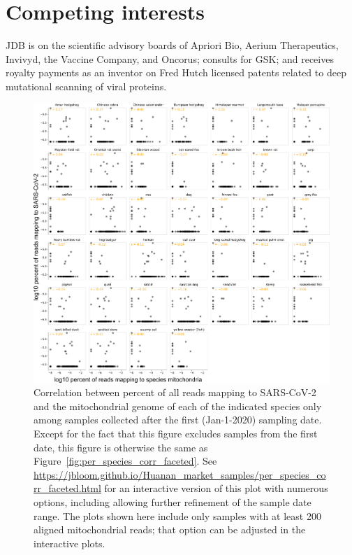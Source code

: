 \documentclass[9pt,twocolumn,twoside]{gsajnl_modified}
\begin{document}
{\section{Competing interests}
JDB is on the scientific advisory boards of Apriori Bio, Aerium Therapeutics, Invivyd, the Vaccine Company, and Oncorus; consults for GSK; and receives royalty payments as an inventor on Fred Hutch licensed patents related to deep mutational scanning of viral proteins.


}

\onecolumn
\renewcommand{\thepage}{S\arabic{page}}
\setcounter{page}{1}
\renewcommand{\thefigure}{S\arabic{figure}}
\setcounter{figure}{0}
\renewcommand{\thetable}{S\arabic{table}}
\setcounter{table}{0}

\clearpage

\begin{figure}
\includegraphics[width=\linewidth]{figures/per_species_corr_faceted_later_dates.png}
\caption{
Correlation between percent of all reads mapping to SARS-CoV-2 and the mitochondrial genome of each of the indicated species only among samples collected after the first (Jan-1-2020) sampling date.
Except for the fact that this figure excludes samples from the first date, this figure is otherwise the same as Figure~\ref{fig:per_species_corr_faceted}.
See \url{https://jbloom.github.io/Huanan_market_samples/per_species_corr_faceted.html} for an interactive version of this plot with numerous options, including allowing further refinement of the sample date range.
The plots shown here include only samples with at least 200 aligned mitochondrial reads; that option can be adjusted in the interactive plots.
\label{fig:per_species_corr_faceted_later_dates}
}
\end{figure}
\end{document}
